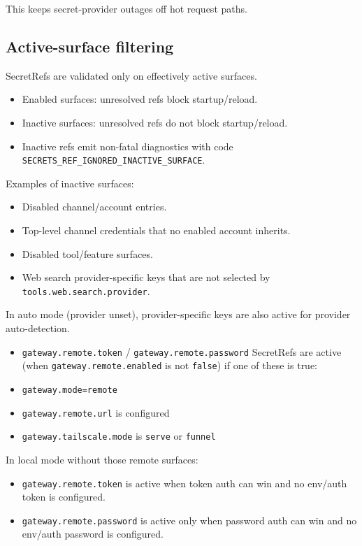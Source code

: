 This keeps secret-provider outages off hot request paths.

\subsection{Active-surface filtering}


SecretRefs are validated only on effectively active surfaces.

\begin{itemize}
  \item Enabled surfaces: unresolved refs block startup/reload.
  \item Inactive surfaces: unresolved refs do not block startup/reload.
  \item Inactive refs emit non-fatal diagnostics with code \texttt{SECRETS\_REF\_IGNORED\_INACTIVE\_SURFACE}.
\end{itemize}


Examples of inactive surfaces:

\begin{itemize}
  \item Disabled channel/account entries.
  \item Top-level channel credentials that no enabled account inherits.
  \item Disabled tool/feature surfaces.
  \item Web search provider-specific keys that are not selected by \texttt{tools.web.search.provider}.
\end{itemize}

In auto mode (provider unset), provider-specific keys are also active for provider auto-detection.
\begin{itemize}
  \item \texttt{gateway.remote.token} / \texttt{gateway.remote.password} SecretRefs are active (when \texttt{gateway.remote.enabled} is not \texttt{false}) if one of these is true:
  \item \texttt{gateway.mode=remote}
  \item \texttt{gateway.remote.url} is configured
  \item \texttt{gateway.tailscale.mode} is \texttt{serve} or \texttt{funnel}
\end{itemize}

In local mode without those remote surfaces:
\begin{itemize}
  \item \texttt{gateway.remote.token} is active when token auth can win and no env/auth token is configured.
  \item \texttt{gateway.remote.password} is active only when password auth can win and no env/auth password is configured.
\end{itemize}


